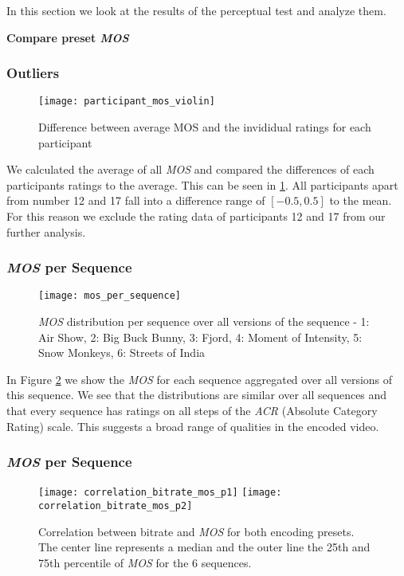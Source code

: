 In this section we look at the results of the perceptual test and analyze them.

\textbf{Compare preset \textit{MOS}}

\subsubsection{Outliers}
\begin{figure}[htb!]
	\centering
	\texttt{[image: participant\_mos\_violin]}
	\caption{Difference between average MOS and the invididual ratings for each participant}
	\label{fig:result:participant_violin}
\end{figure}

We calculated the average of all \textit{MOS} and compared the differences of each participants ratings to the average. This can be seen in \ref{fig:result:participant_violin}. All participants apart from number 12 and 17 fall into a difference range of $[-0.5, 0.5]$ to the mean. For this reason we exclude the rating data of participants 12 and 17 from our further analysis.

\subsubsection{\textit{MOS} per Sequence}
\begin{figure}[htb!]
	\centering
	\texttt{[image: mos\_per\_sequence]}
	\caption{\textit{MOS} distribution per sequence over all versions of the sequence - 1: Air Show, 2: Big Buck Bunny, 3: Fjord, 4: Moment of Intensity, 5: Snow Monkeys, 6: Streets of India}
	\label{fig:result:mos_per_sequence}
\end{figure}

In Figure \ref{fig:result:mos_per_sequence} we show the \textit{MOS} for each sequence aggregated over all versions of this sequence. We see that the distributions are similar over all sequences and that every sequence has ratings on all steps of the \textit{ACR} (Absolute Category Rating) scale. This suggests a broad range of qualities in the encoded video.

\subsubsection{\textit{MOS} per Sequence}
\begin{figure*}[htb!]
	\centering
	\texttt{[image: correlation\_bitrate\_mos\_p1]}
	\texttt{[image: correlation\_bitrate\_mos\_p2]}
	\caption{Correlation between bitrate and \textit{MOS} for both encoding presets. The center line represents a median and the outer line the 25th and 75th percentile of \textit{MOS} for the 6 sequences.}
	\label{fig:result:correlation_bitrate_mos}
\end{figure*}

